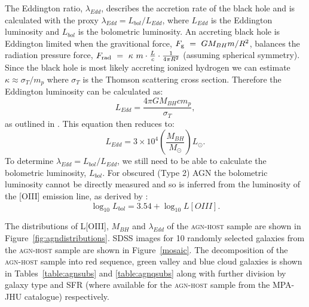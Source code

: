 The Eddington ratio, $\lambda_{Edd}$, describes the accretion rate of the black hole and is calculated with the proxy $\lambda_{Edd} = L_{bol}/L_{Edd}$, where $L_{Edd}$ is the Eddington luminosity and $L_{bol}$ is the bolometric luminosity. An accreting black hole is Eddington limited when the gravitional force, $F_{\rm{g}}~=~GM_{BH}m/R^2$, balances the radiation pressure force, $F_{\rm{rad}}~=~\kappa~m\cdot\frac{L}{c}\cdot\frac{1}{4\pi R^2}$ (assuming spherical symmetry). Since the black hole is most likely accreting ionized hydrogen we can estimate $\kappa\approx \sigma_T/m_p$ where $\sigma_T$ is the Thomson scattering cross section. Therefore the Eddington luminosity can be calculated as:
\begin{equation}
L_{Edd} = \frac{4\pi G M_{BH} c m_p}{\sigma_T},
\end{equation}
as outlined in \citet{binneymerrifield}. This equation then reduces to:
\begin{equation}
L_{Edd} = 3\times10^4 \left(\frac{M_{BH}}{M_{\odot}}\right) L_{\odot}.
\end{equation}
To determine $\lambda_{Edd} = L_{bol}/L_{Edd}$, we still need to be able to calculate the bolometric luminosity, $L_{bol}$. For obscured (Type 2) AGN the bolometric luminosity cannot be directly measured and so is inferred from the luminosity of the [OIII] emission line, as derived by \citet{heckman04}:
\begin{equation}
\log_{10}L_{bol} = 3.54 + \log_{10}L[OIII]. 
\end{equation}


The distributions of L[OIII], $M_{BH}$ and $\lambda_{Edd}$ of the \textsc{agn-host} sample are shown in Figure~\ref{fig:agndistributions}. SDSS images for 10 randomly selected galaxies from the \textsc{agn-host} sample are shown in Figure~\ref{mosaic}. The decomposition of the \textsc{agn-host} sample into red sequence, green valley and blue cloud galaxies is shown in Tables~\ref{table:agnsubs} and \ref{table:agnqsubs} along with further division by galaxy type and SFR (where available for the \textsc{agn-host} sample from the MPA-JHU catalogue) respectively. 

